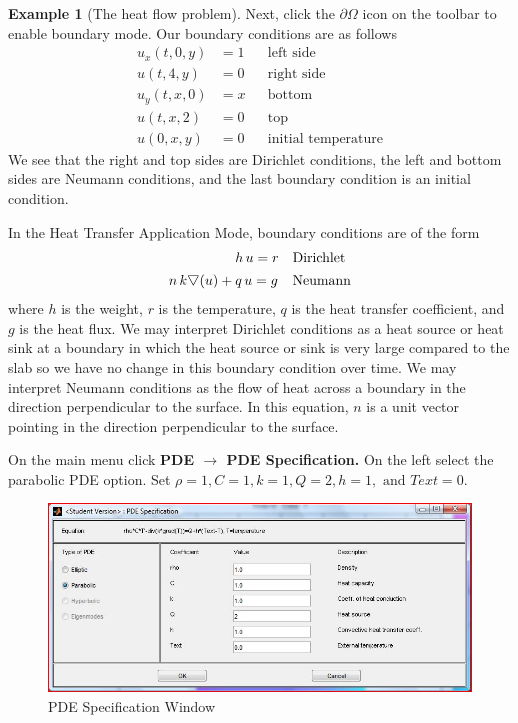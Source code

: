 \documentclass{amsart}
\theoremstyle{definition}
\newtheorem{example}{Example}
\begin{document}
\begin{example}[The heat flow problem]
Next, click the $\partial \Omega$ icon on the toolbar to enable boundary mode. Our boundary conditions are as follows
\begin{align*}
u_x(t,0,y) &= 1  	&&\text{left side} \\
u(t,4,y) &= 0 		&&\text{right side}  \\  
u_y(t,x,0) &= x 	&&\text{bottom}   \\
u(t,x,2) &= 0 		&&   \text{top} \\
u(0,x,y) &= 0 		&& \text{initial temperature}
\end{align*}
We see that the right and top sides are Dirichlet conditions, the left and bottom sides are Neumann conditions, and the last boundary condition is an initial condition. 

 In the Heat Transfer Application Mode, boundary conditions are of the form 
\begin{align*}
					&h \, u = r 	&& \text{Dirichlet} \\
n \, k \raisebox{.4ex}{$\bigtriangledown$} (u) {}+{} 	&q \, u = g 	&&\text{Neumann}
\end{align*}
where $h$ is the weight, $r$ is the temperature, $q$ is the heat transfer coefficient, and $g$ is the heat flux. We may interpret Dirichlet conditions as a heat source or heat sink at a boundary in which the heat source or sink is very large compared to the slab so we have no change in this boundary condition over time. We may interpret Neumann conditions as the flow of heat across a boundary in the direction perpendicular to the surface. In this equation, $n$ is a unit vector pointing in the direction perpendicular to the surface.

On the main menu click \textbf{PDE $\to$ PDE Specification.} On the left select the parabolic PDE option. Set $\rho = 1, C = 1, k = 1, Q = 2, h = 1, \text{ and } Text = 0$. 

\begin{figure}[ht]
   \includegraphics[height = 2 in]{PDESpecificationWindow}
   \caption{PDE Specification Window}
\end{figure}


\end{example}
\end{document}
